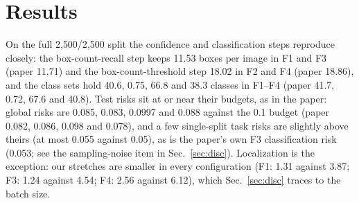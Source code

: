 \documentclass[10pt]{article}
\begin{document}
\section{Results}


On the full 2{,}500/2{,}500 split the confidence and classification steps reproduce closely: the box-count-recall
step keeps 11.53 boxes per image in F1 and F3 (paper 11.71) and the box-count-threshold step 18.02 in F2 and F4 (paper
18.86), and the class sets hold 40.6, 0.75, 66.8 and 38.3 classes in F1--F4 (paper 41.7, 0.72, 67.6 and 40.8). Test
risks sit at or near their budgets, as in the paper: global risks are 0.085, 0.083, 0.0997 and 0.088 against the 0.1
budget (paper 0.082, 0.086, 0.098 and 0.078), and a few single-split task risks are slightly above theirs (at most
0.055 against 0.05), as is the paper's own F3 classification risk (0.053; see the sampling-noise item in
Sec.~\ref{sec:disc}). Localization is the exception: our stretches are smaller in every configuration (F1: 1.31
against 3.87; F3: 1.24 against 4.54; F4: 2.56 against 6.12), which Sec.~\ref{sec:disc} traces to the batch size.

\small
\end{document}

